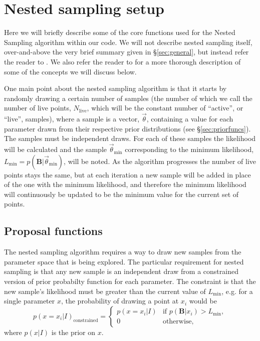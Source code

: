 \section{Nested sampling setup}

Here we will briefly describe some of the core functions used for the Nested Sampling algorithm \citep{Skilling:2006} within our code. We will
not describe nested sampling itself, over-and-above the very brief summary given in \S\ref{sec:general}, but instead refer
the reader to \citet{Veitch:2010}. We also refer the reader to \citet{2015PhRvD..91d2003V} for a more thorough description
of some of the concepts we will discuss below.

One main point about the nested sampling algorithm is that it starts by randomly drawing a certain number of samples (the number of
which we call the number of live points, $N_{\text{live}}$, which will be the constant number of ``active'', or ``live'', samples),  
where a sample is a vector, $\vec{\theta}$, containing a value for each parameter drawn from their respective prior distributions (see \S\ref{sec:priorfuncs}).
The samples must be independent draws. For each of these samples the likelihood will be calculated and the sample $\vec{\theta}_{\text{min}}$
corresponding to the minimum likelihood, $L_{\text{min}} = p(\mathbf{B}|\vec{\theta}_{\text{min}})$, will be noted. As the algorithm
progresses the number of live points stays the
same, but at each iteration a new sample will be added in place of the one with the minimum likelihood, and therefore the
minimum likelihood will continuously be updated to be the minimum value for the current set of points.

\subsection{Proposal functions}\label{sec:proposals}

The nested sampling algorithm requires a way to draw new samples from the parameter space that is being explored. The
particular requirement for nested sampling is that any new sample is an independent draw from a constrained version
of prior probabilty function for each parameter. The constraint is that the new sample's likelihood must be greater
than the current value of $L_{\text{min}}$, e.g. for a single parameter $x$, the probability of drawing a point at $x_i$ 
would be
\begin{equation}
 p(x=x_i|I)_{\text{constrained}} = \begin{cases}
             p(x=x_i|I) & \text{if~} p(\mathbf{B}|x_i) > L_{\text{min}}, \\
             0 & \text{otherwise},
            \end{cases}
\end{equation}
where $p(x|I)$ is the prior on $x$.


